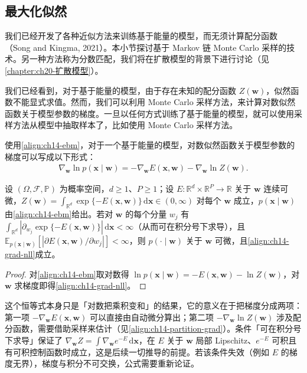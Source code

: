 \documentclass[../../main.tex]{subfiles}
\begin{document}
\subsection{最大化似然}\label{subsection:ch14-最大化似然}

我们已经开发了各种近似方法来训练基于能量的模型，而无须计算配分函数（Song and Kingma, 2021）。本小节探讨基于 Markov 链 Monte Carlo 采样的技术。另一种方法称为分数匹配，我们将在扩散模型的背景下进行讨论（见\cref{chapter:ch20-扩散模型}）。

我们已经看到，对于基于能量的模型，由于存在未知的配分函数 $Z(\bm{w})$，似然函数不能显式求值。然而，我们可以利用 Monte Carlo 采样方法，来计算对数似然函数关于模型参数的梯度。一旦以任何方式训练了基于能量的模型，就可以使用采样方法从模型中抽取样本了，比如使用 Monte Carlo 采样方法。

使用\eqref{align:ch14-ebm}，对于一个基于能量的模型，对数似然函数关于模型参数的梯度可以写成以下形式：
\begin{align}
\nabla_{\bm{w}}\ln p(\bm{x}\mid\bm{w})=-\nabla_{\bm{w}}E(\bm{x},\bm{w})-\nabla_{\bm{w}}\ln Z(\bm{w}).
\label{align:ch14-grad-nll}
\end{align}

\begin{proposition}[对数似然的梯度]\label{proposition:ch14-对数似然梯度}
设 $(\Omega,\mathcal{F},\mathbb{P})$ 为概率空间，$d\geqslant1$、$P\geqslant1$；设 $E:\mathbb{R}^{d}\times\mathbb{R}^{P}\to\mathbb{R}$ 关于 $\bm{w}$ 连续可微，$Z(\bm{w})=\int_{\mathbb{R}^{d}}\exp\{-E(\bm{x},\bm{w})\}\,\mathrm{d}\bm{x}\in(0,\infty)$ 对每个 $\bm{w}$ 成立，$p(\bm{x}\mid\bm{w})$ 由\eqref{align:ch14-ebm}给出。若对 $\bm{w}$ 的每个分量 $w_{j}$ 有 $\int_{\mathbb{R}^{d}}\left|\partial_{w_{j}}\exp\{-E(\bm{x},\bm{w})\}\right|\,\mathrm{d}\bm{x}<\infty$（从而可在积分号下求导），且 $\mathbb{E}_{p(\bm{x}\mid\bm{w})}\left[\left|\partial E(\bm{x},\bm{w})/\partial w_{j}\right|\right]<\infty$，则 $p(\cdot\mid\bm{w})$ 关于 $\bm{w}$ 可微，且\eqref{align:ch14-grad-nll}成立。
\end{proposition}

\begin{proof}
对\eqref{align:ch14-ebm}取对数得 $\ln p(\bm{x}\mid\bm{w})=-E(\bm{x},\bm{w})-\ln Z(\bm{w})$，对 $\bm{w}$ 求梯度即得\eqref{align:ch14-grad-nll}。
\end{proof}

\begin{remark}这个恒等式本身只是「对数把乘积变和」的结果，它的意义在于把梯度分成两项：第一项 $-\nabla_{\bm{w}}E(\bm{x},\bm{w})$ 可以直接由自动微分算出；第二项 $-\nabla_{\bm{w}}\ln Z(\bm{w})$ 涉及配分函数，需要借助采样来估计（见\eqref{align:ch14-partition-grad}）。条件「可在积分号下求导」保证了 $\nabla_{\bm{w}}Z=\int\nabla_{\bm{w}}e^{-E}\,\mathrm{d}\bm{x}$，在 $E$ 关于 $\bm{w}$ 局部 Lipschitz、$e^{-E}$ 可积且有可积控制函数时成立，这是后续一切推导的前提。若该条件失效（例如 $E$ 的梯度无界），梯度与积分不可交换，公式需要重新论证。
\end{remark}
\end{document}
